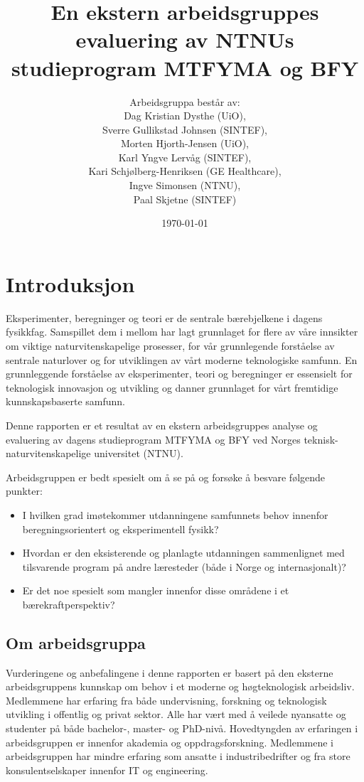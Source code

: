 \documentclass{article}
\title{En ekstern arbeidsgruppes evaluering av NTNUs studieprogram MTFYMA og BFY}
\author{Arbeidsgruppa består av: \\ Dag Kristian Dysthe (UiO), \\ Sverre Gullikstad Johnsen (SINTEF), \\ Morten Hjorth-Jensen (UiO), \\ Karl Yngve Lervåg (SINTEF), \\ Kari Schjølberg-Henriksen (GE Healthcare), \\ Ingve Simonsen (NTNU), \\ Paal Skjetne (SINTEF)}
\date{\today}
\begin{document}
\maketitle
\tableofcontents

\begin{abstract}
\end{abstract}

\section{Introduksjon}
Eksperimenter, beregninger og teori er de sentrale bærebjelkene i dagens fysikkfag. Samspillet dem i mellom  har lagt grunnlaget for flere av våre innsikter om viktige naturvitenskapelige prosesser, for vår grunnlegende forståelse av sentrale naturlover og for utviklingen av vårt moderne teknologiske samfunn. En grunnleggende forståelse av eksperimenter, teori og beregninger er essensielt for  teknologisk innovasjon og utvikling og danner grunnlaget for vårt fremtidige kunnskapsbaserte samfunn.

Denne rapporten er et resultat av en ekstern arbeidsgruppes analyse og evaluering av dagens studieprogram MTFYMA og BFY ved Norges teknisk-naturvitenskapelige universitet (NTNU).

Arbeidsgruppen er bedt spesielt om å se på og forsøke å besvare følgende punkter:
\begin{itemize}
  \item I hvilken grad imøtekommer utdanningene samfunnets behov innenfor beregningsorientert og eksperimentell fysikk?
  \item Hvordan er den eksisterende og planlagte utdanningen sammenlignet med tilsvarende program på andre læresteder (både i Norge og internasjonalt)?
  \item Er det noe spesielt som mangler innenfor disse områdene i et bærekraftperspektiv?
\end{itemize}

\subsection{Om arbeidsgruppa}
Vurderingene og anbefalingene i denne rapporten er basert på den eksterne arbeidsgruppens kunnskap om behov i et moderne og høgteknologisk arbeidsliv.  Medlemmene har erfaring fra både undervisning, forskning og teknologisk utvikling i offentlig og privat sektor. Alle har vært med å veilede nyansatte og studenter på både bachelor-, master- og PhD-nivå. Hovedtyngden av erfaringen i arbeidsgruppen er innenfor akademia og oppdragsforskning. Medlemmene i arbeidsgruppen har mindre erfaring som ansatte i industribedrifter og fra store konsulentselskaper innenfor IT og engineering.
\end{document}
